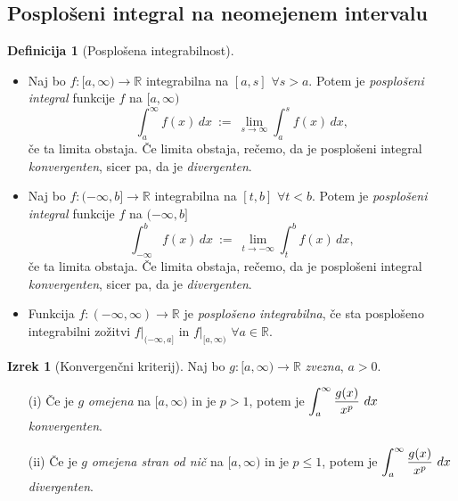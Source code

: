 \documentclass[11pt]{article}
\theoremstyle{definition}
\newtheorem{definicija}{Definicija}[section]
\theoremstyle{definition}
\theoremstyle{definition}
\newtheorem{izrek}{Izrek}[section]
\theoremstyle{theorem}
\begin{document}

\subsection{Posplošeni integral na neomejenem intervalu}
\vspace{0.5cm}

\begin{definicija}[Posplošena integrabilnost]
~
	\begin{itemize}
		\item Naj bo $f:[a, \infty) \rightarrow \mathbb{R}$ integrabilna na $[a, s]$ $\forall s > a$. Potem je \textit{posplošeni integral} funkcije $f$ na $[a, \infty)$
		$$\int_{a}^{\infty} f(x)\,dx ~:=~ \lim_{s \rightarrow \infty} \int_{a}^{s} f(x)\,dx,$$
		če ta limita obstaja. Če limita obstaja, rečemo, da je posplošeni integral \textit{konvergenten}, sicer pa, da je \textit{divergenten}. \\
		\item Naj bo $f:(-\infty, b] \rightarrow \mathbb{R}$ integrabilna na $[t, b]$ $\forall t < b$. Potem je \textit{posplošeni integral} funkcije $f$ na $(-\infty, b]$
		$$\int_{-\infty}^{b} f(x)\,dx ~:=~ \lim_{t \rightarrow -\infty} \int_{t}^{b} f(x)\,dx,$$
		če ta limita obstaja. Če limita obstaja, rečemo, da je posplošeni integral \textit{konvergenten}, sicer pa, da je \textit{divergenten}. \\
		\item Funkcija $f:(-\infty, \infty) \rightarrow \mathbb{R}$ je \textit{posplošeno integrabilna}, če sta posplošeno integrabilni zožitvi $f |_{(-\infty, a]}$ in $f |_{[a, \infty)}$ $\forall a \in \mathbb{R}$. 
	\end{itemize}
\end{definicija}
\vspace{0.5cm}

\begin{izrek}[Konvergenčni kriterij]

Naj bo $g:[a, \infty) \rightarrow \mathbb{R}$ \textit{zvezna}, $a > 0$.
\begin{enumerate}

	\item[(i)] Če je $g$ \textit{omejena} na $[a, \infty)$ in je $p>1$, potem je $\mathlarger{\int_a^{\infty} \frac{g(x)}{x^p}~dx}$ \textit{konvergenten}.
	
	\item[(ii)] Če je $g$ \textit{omejena stran od nič} na $[a, \infty)$ in je $p \leq 1$, potem je $\mathlarger{\int_a^{\infty} \frac{g(x)}{x^p}~dx}$ \textit{divergenten}.

\end{enumerate}

\end{izrek}
\vspace{0.5cm}
\end{document}
